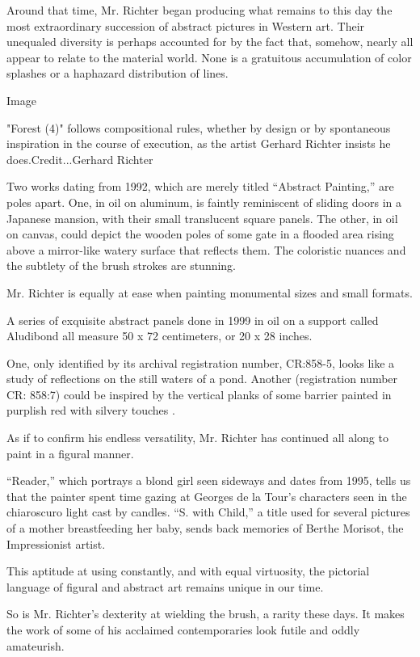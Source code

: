 Around that time, Mr. Richter began producing what remains to this day
the most extraordinary succession of abstract pictures in Western art.
Their unequaled diversity is perhaps accounted for by the fact that,
somehow, nearly all appear to relate to the material world. None is a
gratuitous accumulation of color splashes or a haphazard distribution of
lines.

Image

"Forest (4)" follows compositional rules, whether by design or by
spontaneous inspiration in the course of execution, as the artist
Gerhard Richter insists he does.Credit...Gerhard Richter

Two works dating from 1992, which are merely titled ``Abstract
Painting,'' are poles apart. One, in oil on aluminum, is faintly
reminiscent of sliding doors in a Japanese mansion, with their small
translucent square panels. The other, in oil on canvas, could depict the
wooden poles of some gate in a flooded area rising above a mirror-like
watery surface that reflects them. The coloristic nuances and the
subtlety of the brush strokes are stunning.

Mr. Richter is equally at ease when painting monumental sizes and small
formats.

A series of exquisite abstract panels done in 1999 in oil on a support
called Aludibond all measure 50 x 72 centimeters, or 20 x 28 inches.

One, only identified by its archival registration number, CR:858-5,
looks like a study of reflections on the still waters of a pond. Another
(registration number CR: 858:7) could be inspired by the vertical planks
of some barrier painted in purplish red with silvery touches .

As if to confirm his endless versatility, Mr. Richter has continued all
along to paint in a figural manner.

``Reader,'' which portrays a blond girl seen sideways and dates from
1995, tells us that the painter spent time gazing at Georges de la
Tour's characters seen in the chiaroscuro light cast by candles. ``S.
with Child,'' a title used for several pictures of a mother
breastfeeding her baby, sends back memories of Berthe Morisot, the
Impressionist artist.

This aptitude at using constantly, and with equal virtuosity, the
pictorial language of figural and abstract art remains unique in our
time.

So is Mr. Richter's dexterity at wielding the brush, a rarity these
days. It makes the work of some of his acclaimed contemporaries look
futile and oddly amateurish.

